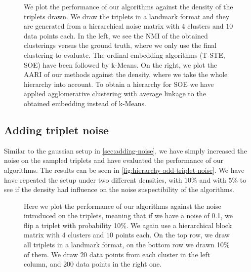 \onecolumn
\begin{figure}[ht]
    \centering
    \caption{
        We plot the performance of our algorithms against the density of the triplets drawn. We draw the triplets in a landmark format 
        and they are generated from a hierarchical noise matrix with $4$ clusters and $10$ data points each. In the left, we see the NMI of 
        the obtained clusterings versus the ground truth, where we only use the final clustering to evaluate. The ordinal embedding algorithms
        (T-STE, SOE) have been followed by k-Means. On the right, 
        we plot the AARI of our methods against the density, where we take the whole hierarchy into account. To obtain a hierarchy for SOE
        we have applied agglomerative clustering with average linkage to the obtained embedding instead of k-Means.
    }
    \label{fig:hierarchy-lowering-density}
\end{figure}

\subsection{Adding triplet noise}\label{sec:h-triplet-noise}
Similar to the gaussian setup in \autoref{sec:adding-noise}, we have simply increased the noise on the sampled triplets and have evaluated the performance of our algorithms. The results
can be seen in \autoref{fig:hierarchy-add-triplet-noise}. We have have repeated the setup under two different densities, with 10\% and with 5\% to see if the density had influence
on the noise suspectibility of the algorithms.
\onecolumn
\begin{figure}[ht]
    \centering
    \hfill
    \caption{
        Here we plot the performance of our algorithms against the noise introduced on the triplets, meaning that if we
        have a noise of 0.1, we flip a triplet with probability 10\%.  We again use a hierarchical block matrix with $4$ clusters and $10$ points each. 
        On the top row, we draw all triplets in a landmark format, on the bottom row we drawn 10\% of them.    
        We draw $20$ data points from each cluster in the left column, and $200$ data points in the right one.
    }
    \label{fig:hierarchy-add-triplet-noise}
\end{figure}

